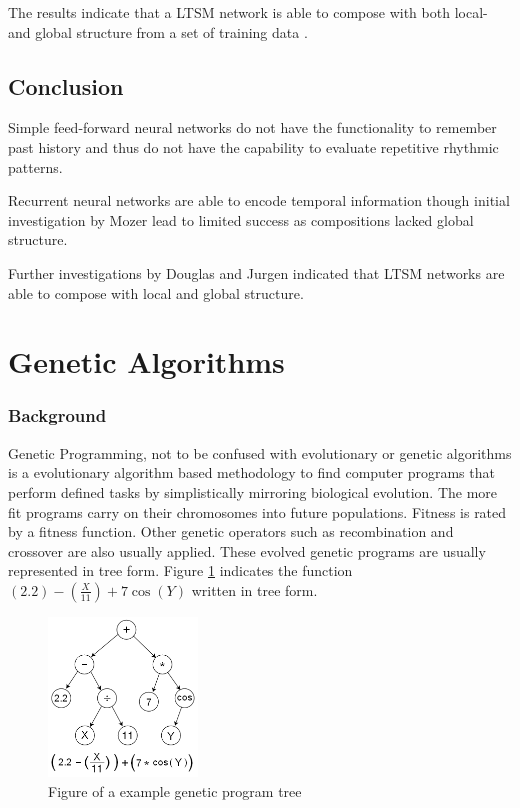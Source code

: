 The results indicate that a \ac{LTSM} network is able to compose with both local- and global structure from a set of training data \cite{Eck2002}.


\subsection{Conclusion}

Simple feed-forward neural networks do not have the functionality to remember past history and thus do not have the capability to evaluate repetitive rhythmic patterns.

Recurrent neural networks are able to encode temporal information though initial investigation by Mozer lead to limited success as compositions lacked global structure. 

Further investigations by Douglas and Jurgen indicated that \ac{LTSM} networks are able to compose with local and global structure.

\section{Genetic Algorithms}
\subsubsection{Background}

Genetic Programming, not to be confused with evolutionary or genetic algorithms is a evolutionary algorithm based methodology to find computer programs that perform defined tasks by simplistically mirroring biological evolution.
The more fit programs carry on their chromosomes into future populations. Fitness is rated by a fitness function. Other genetic operators such as recombination and crossover are also usually applied. 
These evolved genetic programs are usually represented in tree form. Figure \ref{ims:gpt} indicates the function $ (2.2) - (\frac{X}{11}) + 7\cos(Y)$ written in tree form.
\begin{figure}[!bh]
\centerline{\includegraphics[width=150px]{../images/gpt.png}}
\caption{Figure of a example genetic program tree}
\label{ims:gpt}
\end{figure}

